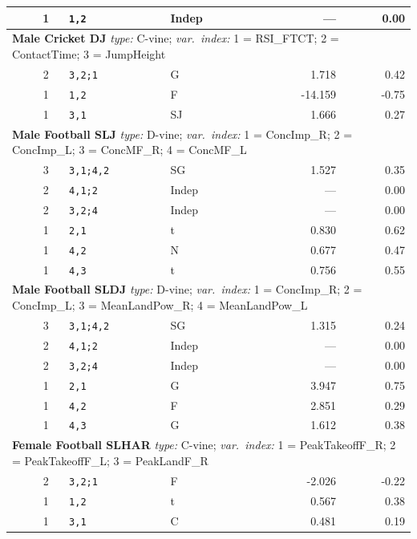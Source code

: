 {\begin{longtable}{lcllrr}
        & 1 & \texttt{1,2} & Indep & --- & 0.00 \\
\midrule
\multicolumn{6}{l}{\textbf{Male Cricket DJ} \hfill {\footnotesize \textit{type:} C-vine; \textit{var.\ index:} 1 = RSI\_FTCT; 2 = ContactTime; 3 = JumpHeight}} \\
        & 2 & \texttt{3,2;1} & G & 1.718 & 0.42 \\
        & 1 & \texttt{1,2} & F & -14.159 & -0.75 \\
        & 1 & \texttt{3,1} & SJ & 1.666 & 0.27 \\
\midrule
\multicolumn{6}{l}{\textbf{Male Football SLJ} \hfill {\footnotesize \textit{type:} D-vine; \textit{var.\ index:} 1 = ConcImp\_R; 2 = ConcImp\_L; 3 = ConcMF\_R; 4 = ConcMF\_L}} \\
        & 3 & \texttt{3,1;4,2} & SG & 1.527 & 0.35 \\
        & 2 & \texttt{4,1;2} & Indep & --- & 0.00 \\
        & 2 & \texttt{3,2;4} & Indep & --- & 0.00 \\
        & 1 & \texttt{2,1} & t & 0.830 & 0.62 \\
        & 1 & \texttt{4,2} & N & 0.677 & 0.47 \\
        & 1 & \texttt{4,3} & t & 0.756 & 0.55 \\
\midrule
\multicolumn{6}{l}{\textbf{Male Football SLDJ} \hfill {\footnotesize \textit{type:} D-vine; \textit{var.\ index:} 1 = ConcImp\_R; 2 = ConcImp\_L; 3 = MeanLandPow\_R; 4 = MeanLandPow\_L}} \\
        & 3 & \texttt{3,1;4,2} & SG & 1.315 & 0.24 \\
        & 2 & \texttt{4,1;2} & Indep & --- & 0.00 \\
        & 2 & \texttt{3,2;4} & Indep & --- & 0.00 \\
        & 1 & \texttt{2,1} & G & 3.947 & 0.75 \\
        & 1 & \texttt{4,2} & F & 2.851 & 0.29 \\
        & 1 & \texttt{4,3} & G & 1.612 & 0.38 \\
\midrule
\multicolumn{6}{l}{\textbf{Female Football SLHAR} \hfill {\footnotesize \textit{type:} C-vine; \textit{var.\ index:} 1 = PeakTakeoffF\_R; 2 = PeakTakeoffF\_L; 3 = PeakLandF\_R}} \\
        & 2 & \texttt{3,2;1} & F & -2.026 & -0.22 \\
        & 1 & \texttt{1,2} & t & 0.567 & 0.38 \\
        & 1 & \texttt{3,1} & C & 0.481 & 0.19 \\

\end{longtable}}
